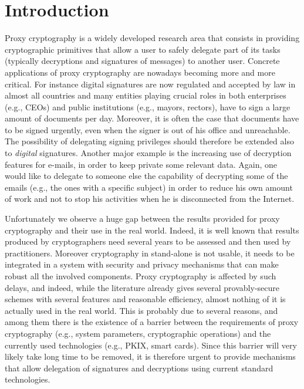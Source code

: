 \documentclass{sig-alternate}
\begin{document}
\section{Introduction}
Proxy cryptography is a widely developed research area that consists in providing cryptographic primitives that allow  a user to safely delegate part of its tasks (typically decryptions and signatures of messages) to another user. Concrete applications of proxy cryptography are nowadays becoming more and more critical. For instance digital signatures are now regulated and accepted by law in almost all countries and many entities playing crucial roles in both enterprises (e.g., CEOs) and public institutions (e.g., mayors, rectors),  have to sign a large amount of documents per day.
Moreover, it is often the case that documents have to be signed urgently, even when the signer is out of his office and unreachable.
The possibility of delegating signing privileges should therefore be extended also to {\em digital} signatures. Another major example is the increasing use of decryption features for e-mails, in order to keep private some relevant data. Again, one would like to delegate to someone else the capability of decrypting some of the emails (e.g., the ones with a specific subject) in order to reduce his own amount of work and not to stop his activities when he is disconnected from the Internet.

Unfortunately we observe a huge gap between the results provided for proxy cryptography and their use in the real world. Indeed, it is well known that results produced by cryptographers need several years to be assessed and then used by practitioners. Moreover cryptography in stand-alone is not usable, it needs to be integrated in a system with  security and privacy mechanisms that can make robust all the involved components.
Proxy cryptography is affected by such delays, and indeed, while the literature already gives several provably-secure schemes with several features and reasonable efficiency, almost nothing of it is actually used in the real world. This is probably due to several reasons, and among them there is the existence
of a barrier between the requirements of proxy cryptography (e.g., system parameters, cryptographic operations) and the currently used technologies (e.g., PKIX, smart cards). Since this barrier will very likely take long time to be removed, it is therefore urgent to provide mechanisms that allow delegation of signatures and decryptions using current standard technologies.
\end{document}

